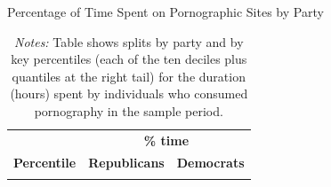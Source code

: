 \documentclass[12pt, letterpaper]{article}
\begin{document}
\begin{table}[ht] \centering \small \setlength\tabcolsep{10 pt}
	\caption{Percentage of Time Spent on Pornographic Sites by Party}
	\label{tab:distribution_prop_duration_party}
	\begin{adjustbox}{max width=\textwidth}
		\begin{tabular}{crr}
			\toprule
			\multicolumn{1}{l}{\textbf{}}&\multicolumn{2}{c}{\textbf{\% time}}\\
			\cmidrule(l){2-3}
			\multicolumn{1}{l}{\textbf{Percentile}}&\multicolumn{1}{c}{\textbf{Republicans}}&\multicolumn{1}{c}{\textbf{Democrats}}\\
			\midrule
			\\
			\bottomrule
		\end{tabular}
	\end{adjustbox}
	\caption*{\footnotesize \emph{Notes:} 
		Table shows splits by party and by key percentiles (each of the ten deciles plus quantiles at the right tail) for the duration (hours) spent by individuals who consumed pornography in the sample period. 
	}
\end{table}

\FloatBarrier
\end{document}

